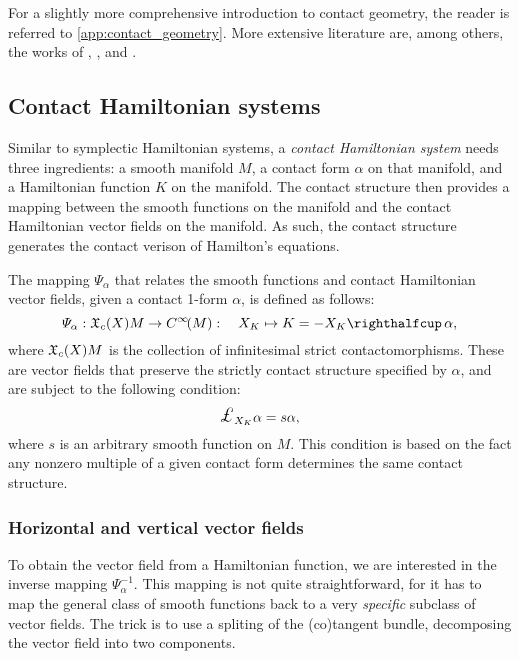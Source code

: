 For a slightly more comprehensive introduction to contact geometry, the reader is referred to \cref{app:contact_geometry}. More extensive literature are, among others, the works of \citet{Geiges2008}, \citet{Libermann1987}, \citet{Arnold1989,Arnold1989a} and \citet{Godbillon1969}.

\subsection{Contact Hamiltonian systems}
\label{ssec:contact_ham_systems}
Similar to symplectic Hamiltonian systems, a \emph{contact Hamiltonian system} needs three ingredients: a smooth manifold \(M\), a contact form \(\alpha\) on that manifold, and a Hamiltonian function \(K\) on the manifold. The contact structure then provides a mapping between the smooth functions on the manifold and the contact Hamiltonian vector fields on the manifold. As such, the contact structure generates the contact verison of Hamilton's equations.

The mapping \(\Psi_\alpha\) that relates the smooth functions and contact Hamiltonian vector fields, given a contact 1-form \(\alpha\), is defined as follows:
\begin{equation}
    \Psi_\alpha: \vsfields{c}{X}{M} \to \functions{M}: \quad X_K \mapsto K = -\intpr{X_K}{\alpha}, 
    \label{eq:psi_definition}
\end{equation}
where \(\mathfrak{X}_{c}\qty(X){M}\) is the collection of infinitesimal strict contactomorphisms. These are vector fields that preserve the strictly contact structure specified by \(\alpha\), and are subject to the following condition:
\begin{equation}
    \lied{X_K}{\alpha} = s \alpha, 
    \label{eq:contact_vf_condition}
\end{equation}
where \(s\) is an arbitrary smooth function on \(M\). This condition is based on the fact any nonzero multiple of a given contact form determines the same contact structure.

\subsubsection{Horizontal and vertical vector fields} 
To obtain the vector field from a Hamiltonian function, we are interested in the inverse mapping \(\Psi^{-1}_\alpha\). This mapping is not quite straightforward, for it has to map the general class of smooth functions back to a very \emph{specific} subclass of vector fields. The trick is to use a spliting of the (co)tangent bundle, decomposing the vector field into two components. 

